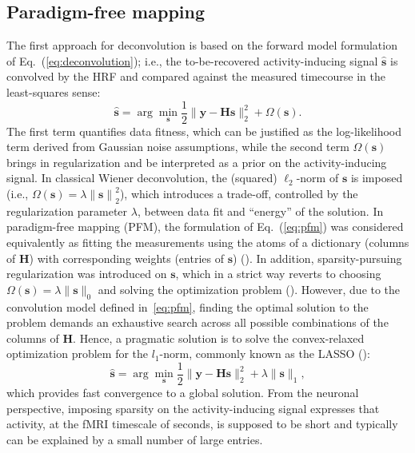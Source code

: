 \subsection{Paradigm-free mapping}
The first approach for deconvolution is based on the forward model formulation of Eq.~(\ref{eq:deconvolution}); i.e., the to-be-recovered activity-inducing signal $\hat{\mathbf{s}}$ is convolved by the HRF and compared against the measured timecourse in the least-squares sense: 
\begin{equation}
    \label{eq:pfm}
    \hat{\mathbf{s}} = \arg \min_{\mathbf{s}} \frac{1}{2} \| \mathbf{y} - \mathbf{Hs} \|_2^2 + \Omega(\mathbf{s}).
\end{equation}
The first term quantifies data fitness, which can be justified as the log-likelihood term derived from Gaussian noise assumptions, while the second term \(\Omega(\mathbf{s})\) brings in regularization and be interpreted as a prior on the activity-inducing signal. In classical Wiener deconvolution, the (squared) $\ell_2$-norm of $\mathbf{s}$ is imposed (i.e., $\Omega(\mathbf{s})=\lambda \left\| \mathbf{s}\right\|_2^2$), which introduces a trade-off, controlled by the regularization parameter $\lambda$, between data fit and ``energy'' of the solution. In paradigm-free mapping (PFM), the formulation of Eq.~(\ref{eq:pfm}) was considered equivalently as fitting the measurements using the atoms of a dictionary (columns of $\mathbf{H}$) with corresponding weights (entries of $\mathbf{s}$) (\citealt{gaudes2011DetectionCharacterizationSingletrial,caballerogaudes2013ParadigmFreeMapping,urunuela2020StabilityBasedSparseParadigm}). 
In addition, sparsity-pursuing regularization was introduced on $\mathbf{s}$, which in a strict way reverts to choosing \(\Omega(\mathbf{s})=\lambda \| \mathbf{s} \|_0\) and solving the optimization problem (\citealt{bruckstein2009SparseSolutionsSystems}). However, due to the convolution model defined in~\eqref{eq:pfm}, finding the optimal solution to the problem demands an exhaustive search across all possible combinations of the columns of \(\mathbf{H}\). Hence, a  pragmatic solution is to solve the convex-relaxed optimization problem for the \(l_1\)-norm, commonly known as the LASSO (\citealt{tibshirani1996RegressionShrinkageSelection}): 
\begin{equation}
    \label{eq:pfm_spike}
    \hat{\mathbf{s}} = \arg \min_{\mathbf{s}} \frac{1}{2} \| \mathbf{y} - \mathbf{Hs} \|_2^2 + \lambda \| \mathbf{s} \|_1,
\end{equation}
which provides fast convergence to a global solution. From the neuronal perspective, imposing sparsity on the activity-inducing signal expresses that activity, at the fMRI timescale of seconds, is supposed to be short and typically can be explained by a small number of large entries. 




